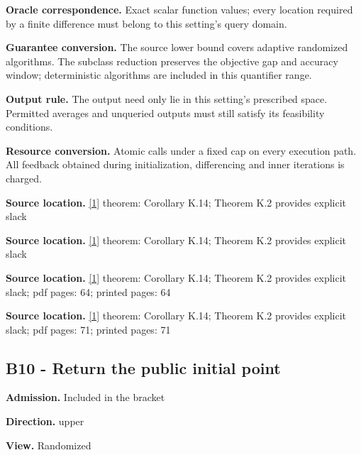 \documentclass[10pt,a4paper]{article}
\begin{document}
\textbf{Oracle correspondence.} Exact scalar function values; every location required by a finite difference must belong to this setting's query domain.



\textbf{Guarantee conversion.} The source lower bound covers adaptive randomized algorithms. The subclass reduction preserves the objective gap and accuracy window; deterministic algorithms are included in this quantifier range.



\textbf{Output rule.} The output need only lie in this setting's prescribed space. Permitted averages and unqueried outputs must still satisfy its feasibility conditions.



\textbf{Resource conversion.} Atomic calls under a fixed cap on every execution path. All feedback obtained during initialization, differencing and inner iterations is charged.



\textbf{Source location.} \href{https://arxiv.org/html/2610.00345v1}{[1]} theorem: Corollary K.14; Theorem K.2 provides explicit slack



\textbf{Source location.} \href{https://arxiv.org/html/2610.00345v1}{[1]} theorem: Corollary K.14; Theorem K.2 provides explicit slack



\textbf{Source location.} \href{https://arxiv.org/html/2610.00345v1}{[1]} theorem: Corollary K.14; Theorem K.2 provides explicit slack; pdf pages: 64; printed pages: 64



\textbf{Source location.} \href{https://arxiv.org/html/2610.00345v1}{[1]} theorem: Corollary K.14; Theorem K.2 provides explicit slack; pdf pages: 71; printed pages: 71



\subsection{B10 - Return the public initial point}


\textbf{Admission.} Included in the bracket



\textbf{Direction.} upper



\textbf{View.} Randomized
\end{document}

